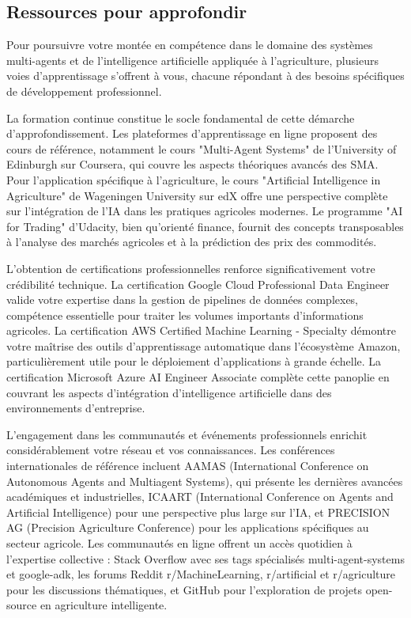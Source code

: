 \subsection{Ressources pour approfondir}

Pour poursuivre votre montée en compétence dans le domaine des systèmes multi-agents et de l'intelligence artificielle appliquée à l'agriculture, plusieurs voies d'apprentissage s'offrent à vous, chacune répondant à des besoins spécifiques de développement professionnel.

La formation continue constitue le socle fondamental de cette démarche d'approfondissement. Les plateformes d'apprentissage en ligne proposent des cours de référence, notamment le cours "Multi-Agent Systems" de l'University of Edinburgh sur Coursera, qui couvre les aspects théoriques avancés des SMA. Pour l'application spécifique à l'agriculture, le cours "Artificial Intelligence in Agriculture" de Wageningen University sur edX offre une perspective complète sur l'intégration de l'IA dans les pratiques agricoles modernes. Le programme "AI for Trading" d'Udacity, bien qu'orienté finance, fournit des concepts transposables à l'analyse des marchés agricoles et à la prédiction des prix des commodités.

L'obtention de certifications professionnelles renforce significativement votre crédibilité technique. La certification Google Cloud Professional Data Engineer valide votre expertise dans la gestion de pipelines de données complexes, compétence essentielle pour traiter les volumes importants d'informations agricoles. La certification AWS Certified Machine Learning - Specialty démontre votre maîtrise des outils d'apprentissage automatique dans l'écosystème Amazon, particulièrement utile pour le déploiement d'applications à grande échelle. La certification Microsoft Azure AI Engineer Associate complète cette panoplie en couvrant les aspects d'intégration d'intelligence artificielle dans des environnements d'entreprise.

L'engagement dans les communautés et événements professionnels enrichit considérablement votre réseau et vos connaissances. Les conférences internationales de référence incluent AAMAS (International Conference on Autonomous Agents and Multiagent Systems), qui présente les dernières avancées académiques et industrielles, ICAART (International Conference on Agents and Artificial Intelligence) pour une perspective plus large sur l'IA, et PRECISION AG (Precision Agriculture Conference) pour les applications spécifiques au secteur agricole. Les communautés en ligne offrent un accès quotidien à l'expertise collective : Stack Overflow avec ses tags spécialisés multi-agent-systems et google-adk, les forums Reddit r/MachineLearning, r/artificial et r/agriculture pour les discussions thématiques, et GitHub pour l'exploration de projets open-source en agriculture intelligente.

